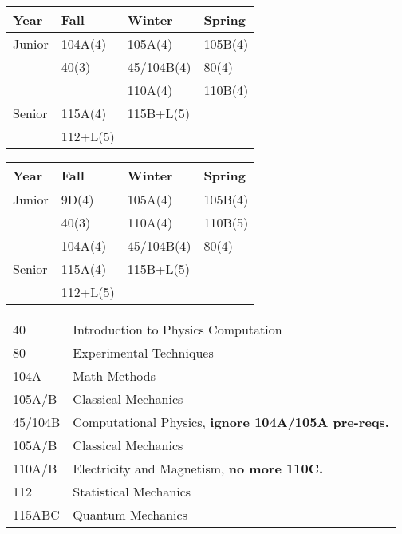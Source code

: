\documentclass[12pt]{article}
\begin{document}
\label{tbl:junior-transition}
\begin{center}
\begin{tabular}{|l|l|l|l|}
\hline
Year      & Fall    & Winter & Spring \\
\hline
Junior & 104A(4)  & 105A(4)   & 105B(4) \\
       & 40(3)    & 45/104B(4)   & 80(4)   \\
       &          & 110A(4)   & 110B(4) \\
Senior & 115A(4)  & 115B+L(5) & \\
       & 112+L(5) & & \\
\hline 
\end{tabular}
\end{center}


\label{tbl:junior-transfer-transition}
\begin{center}
\begin{tabular}{|l|l|l|l|}
\hline
Year      & Fall    & Winter & Spring \\
\hline
Junior   & 9D(4)         & 105A(4)    & 105B(4) \\
         & 40(3)         & 110A(4)    & 110B(5) \\         
         & 104A(4)       & 45/104B(4) & 80(4) \\
\hline
Senior   & 115A(4)    & 115B+L(5)      & \\
         & 112+L(5)   & & \\
\hline 
\end{tabular}
\end{center}

\label{tbl:guide-last}
\begin{center}
\begin{tabular}{|l|l|}
\hline
40 & Introduction to Physics Computation \\ 
80 & Experimental Techniques \\
104A & Math Methods \\
105A/B & Classical Mechanics \\
45/104B & Computational Physics, {\bf ignore 104A/105A pre-reqs.} \\
105A/B & Classical Mechanics \\
110A/B & Electricity and Magnetism, \bf no more 110C. \\
112 & Statistical Mechanics \\
115ABC & Quantum Mechanics \\
\hline
\end{tabular}
\end{center}
\end{document}

